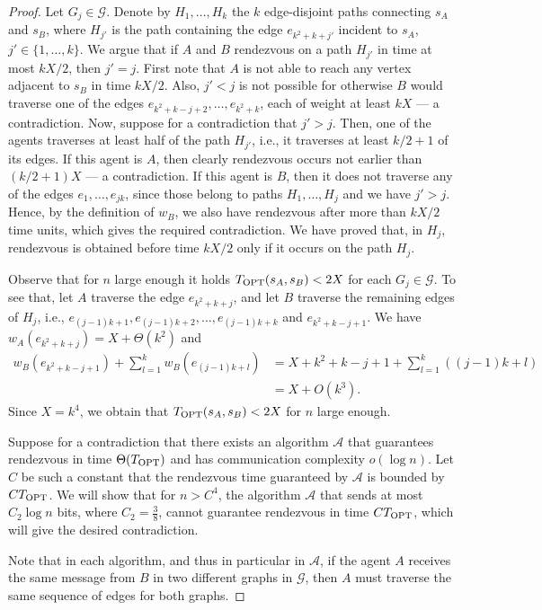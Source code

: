 \documentclass{llncs}
\newcommand{\Topt}[2]{T_{{\scriptsize \textup{OPT}}}(#1,#2)}
\newcommand{\Topts}{T_{\scriptsize \textup{OPT}}}
\newcommand{\startpos}[1]{s_{#1}}
\newcommand{\starta}{\startpos{A}}
\newcommand{\startb}{\startpos{B}}
\newcommand{\cG}{\mathcal{G}}
\newcommand{\cA}{\mathcal{A}}
\begin{document}
\begin{proof}
Let $G_j\in\cG$.
Denote by $H_1,\ldots,H_k$ the $k$ edge-disjoint paths connecting $\starta$ and $\startb$, where $H_{j'}$ is the path containing the edge $e_{k^2+k+j'}$ incident to $\starta$, $j'\in\{1,\ldots,k\}$.
We argue that if $A$ and $B$ rendezvous on a path $H_{j'}$ in time at most $kX/2$, then $j'=j$.
First note that $A$ is not able to reach any vertex adjacent to $\startb$ in time $kX/2$.
Also, $j'<j$ is not possible for otherwise $B$ would traverse one of the edges $e_{k^2+k-j+2},\ldots,e_{k^2+k}$, each of weight at least $kX$ --- a contradiction.
Now, suppose for a contradiction that $j'>j$.
Then, one of the agents traverses at least half of the path $H_{j'}$, i.e., it traverses at least $k/2+1$ of its edges.
If this agent is $A$, then clearly rendezvous occurs not earlier than $(k/2+1)X$ --- a contradiction.
If this agent is $B$, then it does not traverse any of the edges $e_{1},\ldots,e_{jk}$, since those belong to paths $H_1,\ldots,H_j$ and we have $j'>j$.
Hence, by the definition of $w_B$, we also have rendezvous after more than $kX/2$ time units, which gives the required contradiction.
We have proved that, in $H_j$, rendezvous is obtained before time $kX/2$ only if it occurs on the path $H_j$.

Observe that for $n$ large enough it holds $\Topt{\starta}{\startb} < 2X$ for each $G_j\in\cG$.
To see that, let $A$ traverse the edge $e_{k^2+k+j}$, and let $B$ traverse the remaining edges of $H_j$, i.e., $e_{(j-1)k+1},e_{(j-1)k+2},\ldots,e_{(j-1)k+k}$ and $e_{k^2+k-j+1}$.
We have $w_A(e_{k^2+k+j})=X+\Theta(k^2)$ and
\begin{align}
 w_B(e_{k^2+k-j+1})+\sum_{l=1}^{k} w_B(e_{(j-1)k+l}) & = X+k^2+k-j+1 + \sum_{l=1}^k((j-1)k+l) \nonumber \\
   & = X+ O(k^3). \nonumber
\end{align}
Since $X=k^4$, we obtain that $\Topt{\starta}{\startb}<2X$ for $n$ large enough.

Suppose for a contradiction that there exists an algorithm $\cA$ that guarantees rendezvous in time $\Theta(\Topts)$ and has communication complexity $o(\log n)$.
Let $C$ be such a constant that the rendezvous time guaranteed by ${\cA}$ is bounded by $C \Topts$.
We will show that for $n>C^4$, the algorithm $\cA$ that sends at most $C_2\log n$ bits, where $C_2 = \frac{3}{8}$, cannot guarantee rendezvous in time $C\Topts$, which will give the desired contradiction.

Note that in each algorithm, and thus in particular in $\cA$, if the agent $A$ receives the same message from $B$ in two different graphs in $\cG$, then $A$ must traverse the same sequence of edges for both graphs.


\end{proof}
\end{document}

